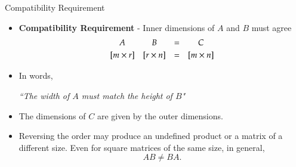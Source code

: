 \documentclass[10pt]{beamer}
\begin{document}

\begin{frame}{Compatibility Requirement}

\begin{itemize}
    \item \textbf{Compatibility Requirement} - Inner dimensions of $A$ and $B$ must agree
\begin{equation*}
    \begin{array}{cccc}
                A       &        B        & = & C \\[3pt]
        [m\times r] & [r\times n] & = & [m\times n]
    \end{array}
\end{equation*}

\item In words,
    \begin{center}
        \textit{``The width of $A$ must match the height of $B$"}
    \end{center}
    \vspace{3mm}

\item The dimensions of $C$ are given by the outer dimensions.
\vfill 

\item Reversing the order may produce an undefined product
or a matrix of a different size. Even for square matrices
of the same size, in general,
\[
    AB\neq BA.
\]
\end{itemize}
\end{frame}
\end{document}
